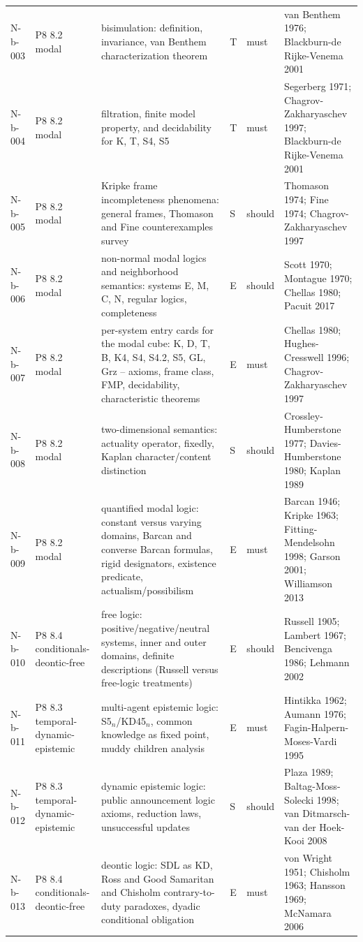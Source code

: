\begin{longtable}{@{}p{0.52in}p{0.85in}p{2.5in}p{0.22in}p{0.42in}p{1.95in}@{}}
N-b-003 & P8 8.2 modal & bisimulation: definition, invariance, van Benthem characterization theorem & T & must & van Benthem 1976; Blackburn-de Rijke-Venema 2001 \\
N-b-004 & P8 8.2 modal & filtration, finite model property, and decidability for K, T, S4, S5 & T & must & Segerberg 1971; Chagrov-Zakharyaschev 1997; Blackburn-de Rijke-Venema 2001 \\
N-b-005 & P8 8.2 modal & Kripke frame incompleteness phenomena: general frames, Thomason and Fine counterexamples survey & S & should & Thomason 1974; Fine 1974; Chagrov-Zakharyaschev 1997 \\
N-b-006 & P8 8.2 modal & non-normal modal logics and neighborhood semantics: systems E, M, C, N, regular logics, completeness & E & should & Scott 1970; Montague 1970; Chellas 1980; Pacuit 2017 \\
N-b-007 & P8 8.2 modal & per-system entry cards for the modal cube: K, D, T, B, K4, S4, S4.2, S5, GL, Grz -- axioms, frame class, FMP, decidability, characteristic theorems & E & must & Chellas 1980; Hughes-Cresswell 1996; Chagrov-Zakharyaschev 1997 \\
N-b-008 & P8 8.2 modal & two-dimensional semantics: actuality operator, fixedly, Kaplan character/content distinction & S & should & Crossley-Humberstone 1977; Davies-Humberstone 1980; Kaplan 1989 \\
N-b-009 & P8 8.2 modal & quantified modal logic: constant versus varying domains, Barcan and converse Barcan formulas, rigid designators, existence predicate, actualism/possibilism & E & must & Barcan 1946; Kripke 1963; Fitting-Mendelsohn 1998; Garson 2001; Williamson 2013 \\
N-b-010 & P8 8.4 conditionals-deontic-free & free logic: positive/negative/neutral systems, inner and outer domains, definite descriptions (Russell versus free-logic treatments) & E & should & Russell 1905; Lambert 1967; Bencivenga 1986; Lehmann 2002 \\
N-b-011 & P8 8.3 temporal-dynamic-epistemic & multi-agent epistemic logic: S5\(_n\)/KD45\(_n\), common knowledge as fixed point, muddy children analysis & E & must & Hintikka 1962; Aumann 1976; Fagin-Halpern-Moses-Vardi 1995 \\
N-b-012 & P8 8.3 temporal-dynamic-epistemic & dynamic epistemic logic: public announcement logic axioms, reduction laws, unsuccessful updates & S & should & Plaza 1989; Baltag-Moss-Solecki 1998; van Ditmarsch-van der Hoek-Kooi 2008 \\
N-b-013 & P8 8.4 conditionals-deontic-free & deontic logic: SDL as KD, Ross and Good Samaritan and Chisholm contrary-to-duty paradoxes, dyadic conditional obligation & E & must & von Wright 1951; Chisholm 1963; Hansson 1969; McNamara 2006 \\

\end{longtable}
